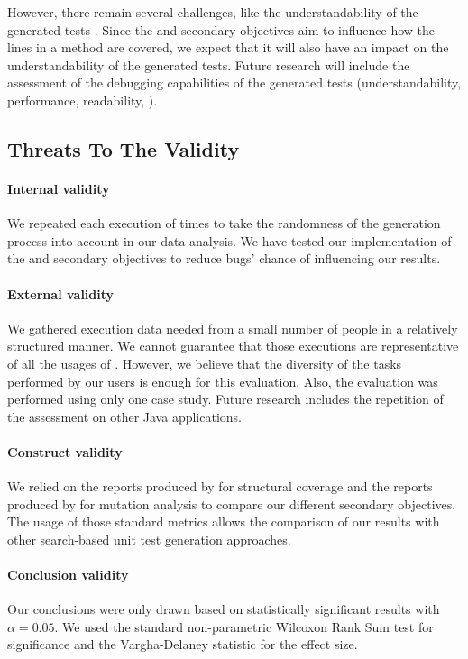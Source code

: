 However, there remain several challenges, like the understandability of the generated tests \cite{FA13challenges, almasi2017industrial}. Since the \com and \ucom secondary objectives aim to influence how the lines in a method are covered, we expect that it will also have an impact on the understandability of the generated tests. Future research will include the assessment of the debugging capabilities of the generated tests (\eg understandability, performance, readability, \etc).


\subsection{Threats To The Validity}

\paragraph{Internal validity}

We repeated each execution of  times to take the randomness of the generation process into account in our data analysis. 
We have tested our implementation of the \com and \ucom secondary objectives to reduce bugs' chance of influencing our results. 

\paragraph{External validity}

We gathered execution data needed from a small number of people in a relatively structured manner. We cannot guarantee that those executions are representative of all the usages of \jabref. However, we believe that the diversity of the tasks performed by our users is enough for this evaluation. 
Also, the evaluation was performed using only one case study. Future research includes the repetition of the assessment on other Java applications. 

\paragraph{Construct validity}

We relied on the reports produced by \evosuite for structural coverage and the reports produced by \pit for mutation analysis to compare our different secondary objectives. The usage of those standard metrics allows the comparison of our results with other search-based unit test generation approaches. 

\paragraph{Conclusion validity}

Our conclusions were only drawn based on statistically significant results with $\alpha=0.05$. We used the standard non-parametric Wilcoxon Rank Sum test for significance and the Vargha-Delaney statistic for the effect size. 
